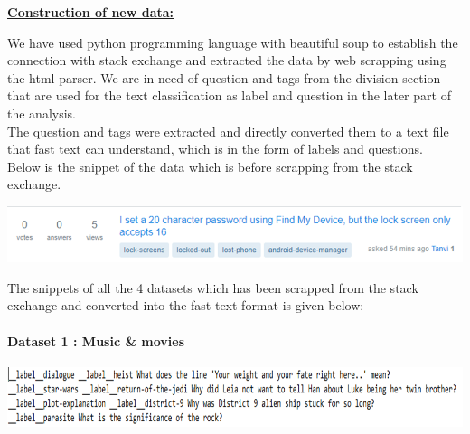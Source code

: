 \documentclass[a4paper,1pt]{article}
\begin{document}
	
	\begin{center}
		\textbf{\underline{Construction of new data:}}
	\end{center}
	
\noindent We have used python programming language with beautiful soup to establish the connection with stack exchange and extracted the data by web scrapping using the html parser. We are in need of question  and tags from the division section that are used for the text classification as label and question in the later part of the analysis.\\

\noindent The question and tags were extracted and directly converted them to a text file that fast text can understand, which is in the form of labels and questions.\\

\noindent Below is the snippet of the data which is before scrapping from the stack exchange. \\

\begin{center}
	\begin{minipage}{\linewidth}
		\centering
		\includegraphics[width=1.0\linewidth]{"Precision and Recall at position 18"}
	
	\end{minipage}
\end{center}



\noindent The snippets of all the 4 datasets which has been scrapped from the stack exchange and converted into the fast text format is given below:\\

\paragraph{Dataset 1 : Music \& movies}

\begin{center}
	\begin{minipage}{\linewidth}
		\centering
		\includegraphics[width=1.0\linewidth]{"Precision and Recall at position 19"}
		
	\end{minipage}
\end{center}
\end{document}
